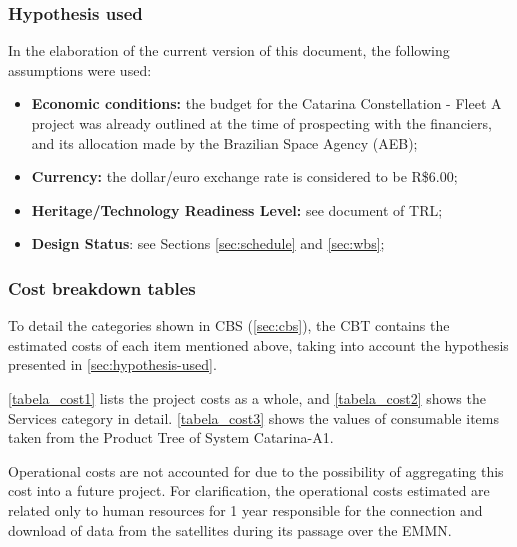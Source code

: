 \subsubsection{Hypothesis used} \label{sec:hypothesis-used}

In the elaboration of the current version of this document, the following assumptions were used:

\begin{itemize}
    \item \textbf{Economic conditions:} the budget for the Catarina Constellation - Fleet A project was already outlined at the time of prospecting with the financiers, and its allocation made by the Brazilian Space Agency (\acs{AEB});
    \item \textbf{Currency:} the dollar/euro exchange rate is considered to be R\$6.00;
    \item \textbf{Heritage/Technology Readiness Level:} see document of \ac{TRL};
    \item \textbf{Design Status}: see Sections \ref{sec:schedule} and \ref{sec:wbs};
\end{itemize}

\subsubsection{Cost breakdown tables} \label{sec:cost_breakdown_tables}

To detail the categories shown in CBS (\autoref{sec:cbs}), the \ac{CBT} contains the estimated costs of each item mentioned above, taking into account the hypothesis presented in \autoref{sec:hypothesis-used}.

\autoref{tabela_cost1} lists the project costs as a whole, and \autoref{tabela_cost2} shows the Services category in detail. \autoref{tabela_cost3} shows the values of consumable items taken from the Product Tree of System Catarina-A1.

Operational costs are not accounted for due to the possibility of aggregating this cost into a future project. For clarification, the operational costs estimated are related only to human resources for 1 year responsible for the connection and download of data from the satellites during its passage over the EMMN.

